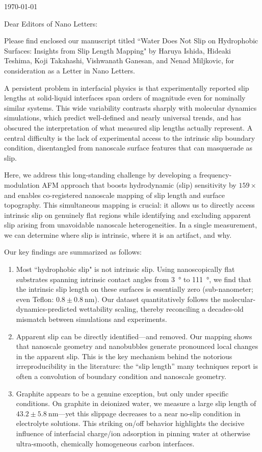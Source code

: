 \documentclass{article}
\begin{document}
\today

Dear Editors of Nano Letters:

Please find enclosed our manuscript titled ``Water Does Not Slip on Hydrophobic Surfaces: Insights from Slip Length Mapping" by Haruya Ishida, Hideaki Teshima, Koji Takahashi, Vishwanath Ganesan, and Nenad Miljkovic, for consideration as a Letter in Nano Letters.

A persistent problem in interfacial physics is that experimentally reported slip lengths at solid-liquid interfaces span orders of magnitude even for nominally similar systems. This wide variability contrasts sharply with molecular dynamics simulations, which predict well-defined and nearly universal trends, and has obscured the interpretation of what measured slip lengths actually represent. A central difficulty is the lack of experimental access to the intrinsic slip boundary condition, disentangled from nanoscale surface features that can masquerade as slip.

Here, we address this long-standing challenge by developing a frequency-modulation AFM approach that boosts hydrodynamic (slip) sensitivity by $159\times$ and enables co-registered nanoscale mapping of slip length and surface topography. This simultaneous mapping is crucial: it allows us to directly access intrinsic slip on genuinely flat regions while identifying and excluding apparent slip arising from unavoidable nanoscale heterogeneities. In a single measurement, we can determine where slip is intrinsic, where it is an artifact, and why.

Our key findings are summarized as follows:
\begin{enumerate}
\item Most ``hydrophobic slip" is not intrinsic slip. Using nanoscopically flat substrates spanning intrinsic contact angles from \SI{3}{\degree} to \SI{111}{\degree}, we find that the intrinsic slip length on these surfaces is essentially zero (sub-nanometer; even Teflon: $0.8 \pm  \SI{0.8}{\nano\metre}$). Our dataset quantitatively follows the molecular-dynamics-predicted wettability scaling, thereby reconciling a decades-old mismatch between simulations and experiments.

\item Apparent slip can be directly identified—and removed. Our mapping shows that nanoscale geometry and nanobubbles generate pronounced local changes in the apparent slip. This is the key mechanism behind the notorious irreproducibility in the literature: the “slip length” many techniques report is often a convolution of boundary condition and nanoscale geometry.

\item Graphite appears to be a genuine exception, but only under specific conditions. On graphite in deionized water, we measure a large slip length of $43.2 \pm \SI{5.8}{\nano\metre}$—yet this slippage decreases to a near no-slip condition in electrolyte solutions. This striking on/off behavior highlights the decisive influence of interfacial charge/ion adsorption in pinning water at otherwise ultra-smooth, chemically homogeneous carbon interfaces.
\end{enumerate}
\end{document}

